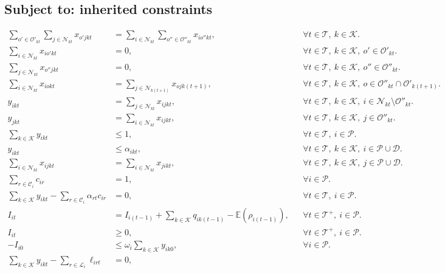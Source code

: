 \documentclass[10pt]{article}
\begin{document}
\subsection*{Subject to: inherited constraints}
\begin{align}
\sum_{o'\in\mathcal O'_{kt}}\sum_{j\in\mathcal N_{kt}}x_{o'jkt}
&=\sum_{i\in\mathcal N_{kt}}\sum_{o''\in\mathcal O''_{kt}}x_{io''kt},
&&\forall t\in\mathcal T,\ k\in\mathcal K.\tag{18}\\
\sum_{i\in\mathcal N_{kt}}x_{io'kt}&=0,
&&\forall t\in\mathcal T,\ k\in\mathcal K,\ o'\in\mathcal O'_{kt}.\tag{19}\\
\sum_{j\in\mathcal N_{kt}}x_{o''jkt}&=0,
&&\forall t\in\mathcal T,\ k\in\mathcal K,\ o''\in\mathcal O''_{kt}.\tag{20}\\
\sum_{i\in\mathcal N_{kt}}x_{iokt}
&=\sum_{j\in\mathcal N_{k(t+1)}}x_{ojk(t+1)},
&&\forall t\in\mathcal T,\ k\in\mathcal K,\ o\in\mathcal O''_{kt}\cap\mathcal O'_{k(t+1)}.\tag{21}\\
 y_{ikt}&=\sum_{j\in\mathcal N_{kt}}x_{ijkt},
&&\forall t\in\mathcal T,\ k\in\mathcal K,\ i\in\mathcal N_{kt}\setminus\mathcal O''_{kt}.\tag{22}\\
 y_{jkt}&=\sum_{i\in\mathcal N_{kt}}x_{ijkt},
&&\forall t\in\mathcal T,\ k\in\mathcal K,\ j\in\mathcal O''_{kt}.\tag{23}\\
\sum_{k\in\mathcal K}y_{ikt}&\leqslant1,
&&\forall t\in\mathcal T,\ i\in\mathcal P.\tag{24}\\
 y_{ikt}&\leqslant\alpha_{ikt},
&&\forall t\in\mathcal T,\ k\in\mathcal K,\ i\in\mathcal P\cup\mathcal D.\tag{25}\\
\sum_{i\in\mathcal N_{kt}}x_{ijkt}&=\sum_{i\in\mathcal N_{kt}}x_{jikt},
&&\forall t\in\mathcal T,\ k\in\mathcal K,\ j\in\mathcal P\cup\mathcal D.\tag{26}\\
\sum_{r\in\mathcal C_i}c_{ir}&=1,
&&\forall i\in\mathcal P.\tag{27}\\
\sum_{k\in\mathcal K}y_{ikt}-\sum_{r\in\mathcal C_i}\alpha_{rt}c_{ir}&=0,
&&\forall t\in\mathcal T,\ i\in\mathcal P.\tag{28}\\
 I_{it}&=I_{i(t-1)}+\sum_{k\in\mathcal K}q_{ik(t-1)}-\mathbb E(\rho_{i(t-1)}),
&&\forall t\in\mathcal T^+,\ i\in\mathcal P.\tag{29}\\
 I_{it}&\geqslant0,
&&\forall t\in\mathcal T^+,\ i\in\mathcal P.\tag{30}\\
 -I_{i0}&\leqslant\omega_i\sum_{k\in\mathcal K}y_{ik0},
&&\forall i\in\mathcal P.\tag{31}\\
\sum_{k\in\mathcal K}y_{ikt}-\sum_{r\in\mathcal L_i}\ell_{irt}&=0,

\end{align}
\end{document}
